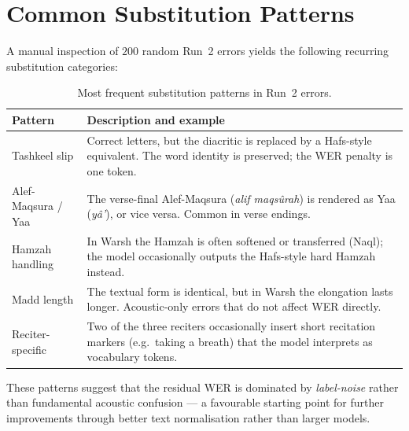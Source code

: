 \documentclass[12pt,a4paper]{report}
\begin{document}
\section{Common Substitution Patterns}

A manual inspection of $200$ random Run~2 errors yields the following
recurring substitution categories:

\begin{table}[H]
  \centering
  \caption{Most frequent substitution patterns in Run~2 errors.}
  \label{tab:mt_substitutions}
  \renewcommand{\arraystretch}{1.3}
  \begin{tabular}{lp{8.5cm}}
    \toprule
    \textbf{Pattern} & \textbf{Description and example} \\
    \midrule
    Tashkeel slip          & Correct letters, but the diacritic is replaced
                              by a Hafs-style equivalent. The word identity
                              is preserved; the WER penalty is one token. \\
    Alef-Maqsura / Yaa     & The verse-final Alef-Maqsura
                              (\textit{alif maqs{\^u}rah}) is rendered as
                              Yaa (\textit{y{\^a}'}), or vice versa.
                              Common in verse endings. \\
    Hamzah handling        & In Warsh the Hamzah is often softened or
                              transferred (Naql); the model occasionally
                              outputs the Hafs-style hard Hamzah instead. \\
    Madd length            & The textual form is identical, but in Warsh
                              the elongation lasts longer. Acoustic-only
                              errors that do not affect WER directly. \\
    Reciter-specific       & Two of the three reciters occasionally insert
                              short recitation markers (e.g.\ taking a
                              breath) that the model interprets as
                              vocabulary tokens. \\
    \bottomrule
  \end{tabular}
\end{table}

These patterns suggest that the residual WER is dominated by
\emph{label-noise} rather than fundamental acoustic confusion --- a
favourable starting point for further improvements through better
text normalisation rather than larger models.
\end{document}
